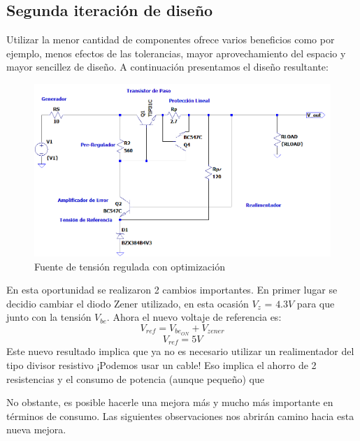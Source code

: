 \subsection{Segunda iteración de diseño}
Utilizar la menor cantidad de componentes ofrece varios beneficios como por ejemplo, menos efectos de las tolerancias, mayor aprovechamiento del espacio y mayor sencillez de diseño.
A continuación presentamos el diseño resultante:
\begin{figure}[H]
	\centering
	\includegraphics[width=0.7\linewidth]{ImagenesEjercicio1/ImagenCircuitoFLcasiPelada.PNG}
	\caption{Fuente de tensión regulada con optimización}
	\label{fig:imagencircuitofl}
\end{figure}
En esta oportunidad se realizaron 2 cambios importantes. En primer lugar se decidio cambiar el diodo Zener utilizado, en esta ocasión $V_z$ = $4.3V$ para que junto con la tensión $V_{be}$.
Ahora el nuevo voltaje de referencia es:
\begin{equation}
	V_{ref} = V_{be_{ON}} + V_{zener}
\end{equation}
\begin{equation}
	V_{ref} = 5V
\end{equation}
Este nuevo resultado implica que ya no es necesario utilizar un realimentador del tipo divisor resistivo ¡Podemos usar un cable! Eso implica el ahorro de 2 resistencias y el consumo de potencia (aunque pequeño) que 

No obstante, es posible hacerle una mejora más y mucho más importante en términos de consumo. Las siguientes observaciones nos abrirán camino hacia esta nueva mejora.

